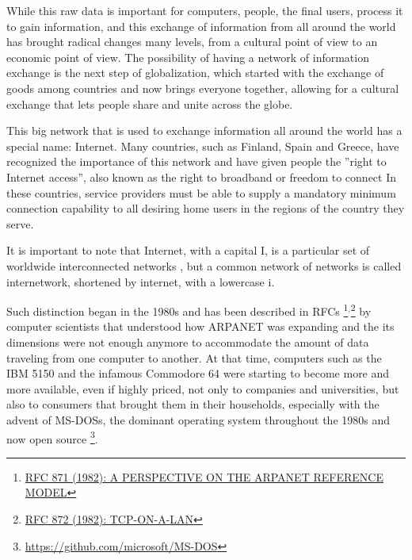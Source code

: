 	While this raw data is important for computers, people, the final users, process it to gain information, and this exchange of information from all around the world has brought radical changes many levels, from a cultural point of view to an economic point of view.
	The possibility of having a network of information exchange is the next step of globalization, which started with the exchange of goods among countries and now brings everyone together, allowing for a cultural exchange that lets people share and unite across the globe.
	
	This big network that is used to exchange information all around the world has a special name: Internet.
	Many countries, such as Finland, Spain and Greece, have recognized the importance of this network and have given people the ''right to Internet access'', also known as the right to broadband or freedom to connect
	In these countries, service providers must be able to supply a mandatory minimum connection capability to all desiring home users in the regions of the country they serve.
	
	It is important to note that Internet, with a capital I, is a particular set of worldwide interconnected networks \cite{gg243376}, but a common network of networks is called internetwork, shortened by internet, with a lowercase i.
	
	Such distinction began in the 1980s and has been described in RFCs \footnote{\href{https://datatracker.ietf.org/doc/html/rfc871}{RFC 871 (1982): A PERSPECTIVE ON THE ARPANET REFERENCE MODEL}}$^{,}$\footnote{\href{https://datatracker.ietf.org/doc/html/rfc872}{RFC 872 (1982): TCP-ON-A-LAN}} by computer scientists that understood how ARPANET was expanding and the its dimensions were not enough anymore to accommodate the amount of data traveling from one computer to another.
	At that time, computers such as the IBM 5150 and the infamous Commodore 64 were starting to become more and more available, even if highly priced, not only to companies and universities, but also to consumers that brought them in their households, especially with the advent of MS-DOSs, the dominant operating system throughout the 1980s and now open source \footnote{\url{https://github.com/microsoft/MS-DOS}}.
	
